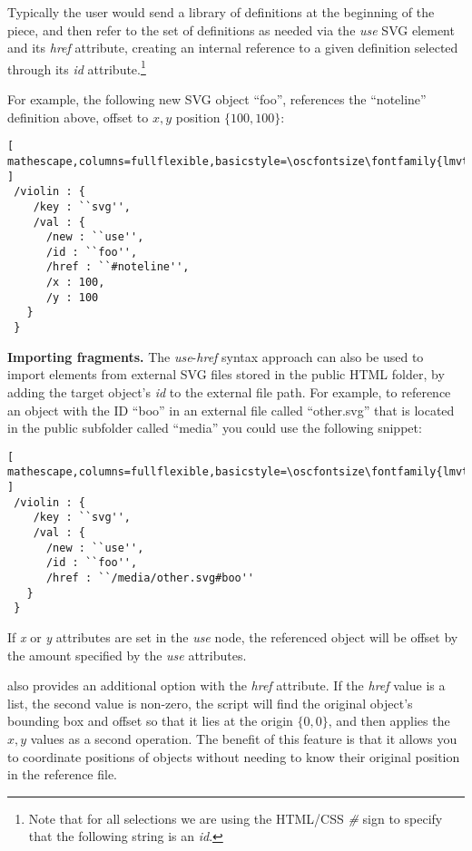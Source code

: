 Typically the user would send a library of definitions at the beginning of the piece, and then refer to the set of definitions as needed via the \textit{use} SVG element and its \textit{href} attribute, creating an internal reference to a given definition selected through its \textit{id} attribute.\footnote{Note that for all selections we are using the HTML/CSS \textit{\#} sign to specify that the following string is an \textit{id}.}

For example, the following new SVG object ``foo'', references the ``noteline'' definition above, offset to ${x,y}$ position $\{100,100\}$:

\begin{minipage}{\linewidth}
\begin{lstlisting}[ mathescape,columns=fullflexible,basicstyle=\oscfontsize\fontfamily{lmvtt}\selectfont ]
 /violin : {
    /key : ``svg'',
    /val : {
      /new : ``use'',
      /id : ``foo'',
      /href : ``#noteline'',
      /x : 100,
      /y : 100
   }
 }
 \end{lstlisting}
\end{minipage}

\medskip
\noindent
\textbf{Importing fragments.} 
The \textit{use}-\textit{href} syntax approach can also be used to import elements from external SVG files stored in the public HTML folder, by adding the target object's \textit{id} to the external file path.
For example, to reference an object with the ID ``boo'' in an external file called ``other.svg'' that is located in the public subfolder called ``media'' you could use the following snippet:

\begin{lstlisting}[ mathescape,columns=fullflexible,basicstyle=\oscfontsize\fontfamily{lmvtt}\selectfont ]
 /violin : {
    /key : ``svg'',
    /val : {
      /new : ``use'',
      /id : ``foo'',
      /href : ``/media/other.svg#boo''
   }
 }
 \end{lstlisting}

If \textit{x} or \textit{y} attributes are set in the \textit{use} node, the referenced object will be offset by the amount specified by the  \textit{use} attributes.

\drawsocket also provides an additional option with the \textit{href} attribute. If the \textit{href} value is a list, the second value is non-zero, the script will find the original object's bounding box and offset so that it lies at the origin $\{0,0\}$, and then applies the ${x,y}$ values as a second operation. The benefit of this feature is that it allows you to coordinate positions of objects without needing to know their original position in the reference file.

